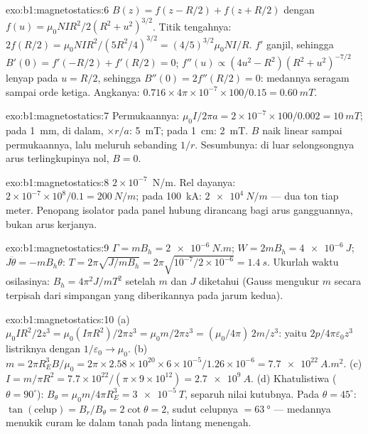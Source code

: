 \begin{solution}{exo:b1:magnetostatics:6}
$B(z) = f(z - R/2) + f(z + R/2)$ dengan $f(u) = \mu_0NIR^2/2(R^2 + u^2)^{3/2}$.
Titik tengahnya: $2f(R/2) = \mu_0NIR^2/(5R^2/4)^{3/2} = (4/5)^{3/2}\mu_0NI/R$. $f'$
ganjil, sehingga $B'(0) = f'(-R/2) + f'(R/2) = 0$; $f''(u) \propto (4u^2 - R^2)(R^2 +
u^2)^{-7/2}$ lenyap pada $u = R/2$, sehingga $B''(0) = 2f''(R/2) = 0$: medannya
seragam sampai orde ketiga. Angkanya: $0.716 \times 4\pi \times 10^{-7} \times 100/0.15 =
\qty{0.60}{mT}$.
\end{solution}

\begin{solution}{exo:b1:magnetostatics:7}
Permukaannya: $\mu_0I/2\pi a = 2 \times 10^{-7} \times 100/0.002 = \qty{10}{mT}$; pada
\qty{1}{mm}, di dalam, $\times r/a$: \qty{5}{mT}; pada \qty{1}{cm}: \qty{2}{mT}. $B$ naik
linear sampai permukaannya, lalu meluruh sebanding $1/r$. Sesumbunya: di luar selongsongnya
arus terlingkupinya nol, $B = 0$.
\end{solution}

\begin{solution}{exo:b1:magnetostatics:8}
$2 \times 10^{-7}$~N/m. Rel dayanya: $2 \times 10^{-7} \times 10^8/0.1 = \qty{200}{N/m}$;
pada \qty{100}{kA}: $\qty{2e4}{N/m}$ --- dua ton tiap meter. Penopang
isolator pada panel hubung dirancang bagi arus gangguannya, bukan arus
kerjanya.
\end{solution}

\begin{solution}{exo:b1:magnetostatics:9}
$\Gamma = mB_h = \qty{2e-6}{N.m}$; $W = 2mB_h = \qty{4e-6}{J}$; $J\ddot\theta =
-mB_h\theta$: $T = 2\pi\sqrt{J/mB_h} = 2\pi\sqrt{10^{-7}/2 \times 10^{-6}} =
\qty{1.4}{s}$. Ukurlah waktu osilasinya: $B_h = 4\pi^2J/mT^2$ setelah $m$ dan $J$
diketahui (Gauss mengukur $m$ secara terpisah dari simpangan yang diberikannya
pada jarum kedua).
\end{solution}

\begin{solution}{exo:b1:magnetostatics:10}
(a) $\mu_0IR^2/2z^3 = \mu_0(I\pi R^2)/2\pi z^3 = \mu_0m/2\pi z^3 = (\mu_0/4\pi)\,2m/z^3$:
yaitu $2p/4\pi\varepsilon_0z^3$ listriknya dengan $1/\varepsilon_0 \to \mu_0$. (b) $m = 2\pi R_E^3B/
\mu_0 = 2\pi \times 2.58 \times 10^{20} \times 6 \times 10^{-5}/1.26 \times 10^{-6} = \qty{7.7e22}{A.m^2}$.
(c) $I = m/\pi R^2 = 7.7 \times 10^{22}/(\pi \times 9 \times 10^{12}) = \qty{2.7e9}{A}$. (d)
Khatulistiwa ($\theta = 90^\circ$): $B_\theta = \mu_0m/4\pi R_E^3 = \qty{3e-5}{T}$, separuh
nilai kutubnya. Pada $\theta = 45^\circ$: $\tan(\text{celup}) = B_r/B_\theta = 2\cot\theta = 2$,
sudut celupnya $= \qty{63}{\degree}$ --- medannya menukik curam ke dalam tanah pada
lintang menengah.
\end{solution}

